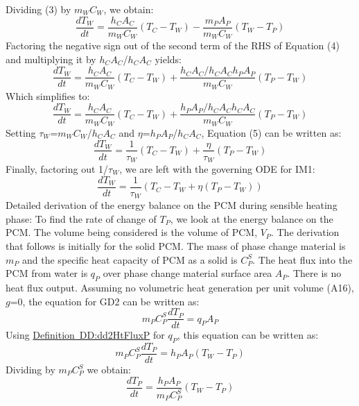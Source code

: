 \documentclass[12pt]{article}
\begin{document}
Dividing (3) by $m_{W}$$C_{W}$, we obtain:
\begin{equation}
\frac{dT_{W}}{dt}=\frac{h_{C}A_{C}}{m_{W}C_{W}}(T_{C}-T_{W})-\frac{m_{P}A_{P}}{m_{W}C_{W}}(T_{W}-T_{P})
\end{equation}
Factoring the negative sign out of the second term of the RHS of Equation (4) and multiplying it by $h_{C}$$A_{C}$/$h_{C}$$A_{C}$ yields:
\begin{equation}
\frac{dT_{W}}{dt}=\frac{h_{C}A_{C}}{m_{W}C_{W}}(T_{C}-T_{W})+\frac{h_{C}A_{C}/h_{C}A_{C}h_{P}A_{P}}{m_{W}C_{W}}(T_{P}-T_{W})
\end{equation}
Which simplifies to:
\begin{equation}
\frac{dT_{W}}{dt}=\frac{h_{C}A_{C}}{m_{W}C_{W}}(T_{C}-T_{W})+\frac{h_{P}A_{P}/h_{C}A_{C}h_{C}A_{C}}{m_{W}C_{W}}(T_{P}-T_{W})
\end{equation}
Setting $\tau{}_{W}$=$m_{W}$$C_{W}$/$h_{C}$$A_{C}$ and $\eta{}$=$h_{P}$$A_{P}$/$h_{C}$$A_{C}$, Equation (5) can be written as:
\begin{equation}
\frac{dT_{W}}{dt}=\frac{1}{\tau{}_{W}}(T_{C}-T_{W})+\frac{\eta{}}{\tau{}_{W}}(T_{P}-T_{W})
\end{equation}
Finally, factoring out 1/$\tau{}_{W}$, we are left with the governing ODE for IM1:
\begin{equation}
\frac{dT_{W}}{dt}=\frac{1}{\tau{}_{W}}(T_{C}-T_{W}+\eta{}(T_{P}-T_{W}))
\end{equation}
Detailed derivation of the energy balance on the PCM during sensible heating phase:
To find the rate of change of $T_{P}$, we look at the energy balance on the PCM. The volume being considered is the volume of PCM, $V_{P}$. The derivation that follows is initially for the solid PCM. The mass of phase change material is $m_{P}$ and the specific heat capacity of PCM as a solid is $C_{P}^{S}$. The heat flux into the PCM from water is $q_{P}$ over phase change material surface area $A_{P}$. There is no heat flux output. Assuming no volumetric heat generation per unit volume (A16), $g$=0, the equation for GD2 can be written as:
\begin{equation}
m_{P}C_{P}^{S}\frac{dT_{P}}{dt}=q_{P}A_{P}
\end{equation}
Using \hyperref[DD:dd2HtFluxP]{Definition~DD:dd2HtFluxP} for $q_{P}$, this equation can be written as:
\begin{equation}
m_{P}C_{P}^{S}\frac{dT_{P}}{dt}=h_{P}A_{P}(T_{W}-T_{P})
\end{equation}
Dividing by $m_{P}$$C_{P}^{S}$ we obtain:
\begin{equation}
\frac{dT_{P}}{dt}=\frac{h_{P}A_{P}}{m_{P}C_{P}^{S}}(T_{W}-T_{P})
\end{equation}
\end{document}
